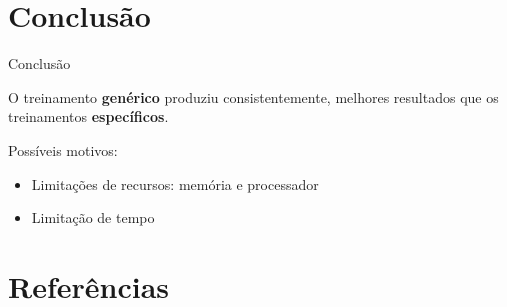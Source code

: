 \documentclass{beamer}
\begin{document}
    \section{Conclusão}

    \begin{frame}{Conclusão}{\thesection \, \secname}
        
        O treinamento \textbf{genérico} produziu consistentemente, melhores resultados que os treinamentos \textbf{específicos}.

        \vspace{0.2cm}
        
        \pause

        Possíveis motivos:

        \begin{itemize}
            \item Limitações de recursos: memória e processador
            \pause 
            \item Limitação de tempo
        \end{itemize}

    \end{frame}

    \section{Referências}

    \begin{frame}[allowframebreaks]
        
        
    \end{frame}
\end{document}
